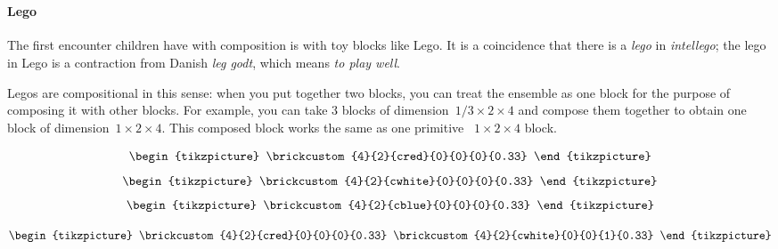

\section{}

\paragraph{Lego}

The first encounter children have with composition is with toy blocks like Lego. It is a coincidence that there is a \emph{lego} in \emph{intellego}; the lego in Lego is a contraction from Danish \emph{leg godt}, which means \emph{to play well}.

Legos are compositional in this sense: when you put together two blocks, you can treat the ensemble as one block for the purpose of composing it with other blocks. For example, you can take 3 blocks of dimension~$1/3 \times 2 \times 4$ and compose them together to obtain one block of dimension~$1 \times 2 \times 4$. This composed block works the same as one primitive ~$1 \times 2 \times 4 $ block.


\begin{equation}\label{eq:lego-red1}
\begin{tikzpicture}
  \brickcustom{4}{2}{cred}{0}{0}{0}{0.33} %
\end{tikzpicture}
\end{equation}
\begin{equation}\label{eq:lego-white1}
\begin{tikzpicture}
  \brickcustom{4}{2}{cwhite}{0}{0}{0}{0.33} %
\end{tikzpicture}
\end{equation}
\begin{equation}\label{eq:lego-blue1}
\begin{tikzpicture}
  \brickcustom{4}{2}{cblue}{0}{0}{0}{0.33} %
\end{tikzpicture}
\end{equation}


\begin{equation}\label{eq:lego-red1-white1}
\begin{tikzpicture}
\brickcustom{4}{2}{cred}{0}{0}{0}{0.33}
\brickcustom{4}{2}{cwhite}{0}{0}{1}{0.33} %
\end{tikzpicture}
\end{equation}



